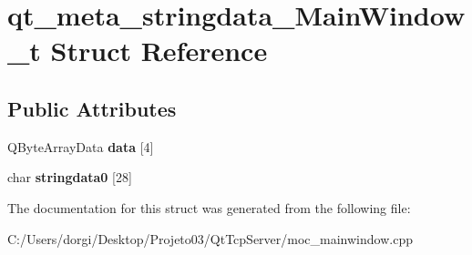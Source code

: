 \hypertarget{structqt__meta__stringdata___main_window__t}{}\section{qt\+\_\+meta\+\_\+stringdata\+\_\+\+Main\+Window\+\_\+t Struct Reference}
\label{structqt__meta__stringdata___main_window__t}
\subsection*{Public Attributes}
\begin{DoxyCompactItemize}
\item 
\mbox{\label{structqt__meta__stringdata___main_window__t_a332d7fa058028f7613b5ba68abb5a7fe}} 
Q\+Byte\+Array\+Data {\bfseries data} \mbox{[}4\mbox{]}
\item 
\mbox{\label{structqt__meta__stringdata___main_window__t_a10e266ffded4c5e956d35d922fa94828}} 
char {\bfseries stringdata0} \mbox{[}28\mbox{]}
\end{DoxyCompactItemize}


The documentation for this struct was generated from the following file\+:\begin{DoxyCompactItemize}
\item 
C\+:/\+Users/dorgi/\+Desktop/\+Projeto03/\+Qt\+Tcp\+Server/moc\+\_\+mainwindow.\+cpp\end{DoxyCompactItemize}
